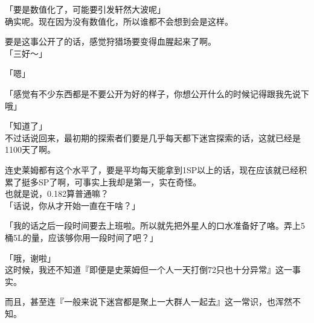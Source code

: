 「要是数值化了，可能要引发轩然大波呢」\\

确实呢。现在因为没有数值化，所以谁都不会想到会是这样。

要是这事公开了的话，感觉狩猎场要变得血腥起来了啊。\\

「三好～」

「嗯」

「感觉有不少东西都是不要公开为好的样子，你想公开什么的时候记得跟我先说下哦」

「知道了」\\

不过话说回来，最初期的探索者们要是几乎每天都下迷宫探索的话，这就已经是1100天了啊。

连史莱姆都有这个水平了，要是平均每天能拿到1SP以上的话，现在应该就已经积累了挺多SP了啊，可事实上我却是第一，实在奇怪。\\

也就是说，0.182算普通嘛？\\

「话说，你从才开始一直在干啥？」

「我的话之后一段时间要去上班啦。所以就先把外星人的口水准备好了咯。弄上5桶5L的量，应该够你用一段时间了吧？」

「哦，谢啦」\\

这时候，我还不知道『即便是史莱姆但一个人一天打倒72只也十分异常』这一事实。

而且，甚至连『一般来说下迷宫都是聚上一大群人一起去』这一常识，也浑然不知。\\
